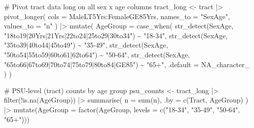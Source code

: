 \documentclass[
  12pt]{article}
\newenvironment{Shaded}{\begin{snugshade}}{\end{snugshade}}
\newcommand{\AttributeTok}[1]{\textcolor[rgb]{0.40,0.45,0.13}{#1}}
\newcommand{\CommentTok}[1]{\textcolor[rgb]{0.37,0.37,0.37}{#1}}
\newcommand{\ConstantTok}[1]{\textcolor[rgb]{0.56,0.35,0.01}{#1}}
\newcommand{\FunctionTok}[1]{\textcolor[rgb]{0.28,0.35,0.67}{#1}}
\newcommand{\NormalTok}[1]{\textcolor[rgb]{0.00,0.23,0.31}{#1}}
\newcommand{\OtherTok}[1]{\textcolor[rgb]{0.00,0.23,0.31}{#1}}
\newcommand{\SpecialCharTok}[1]{\textcolor[rgb]{0.37,0.37,0.37}{#1}}
\newcommand{\StringTok}[1]{\textcolor[rgb]{0.13,0.47,0.30}{#1}}
\begin{document}
\begin{Shaded}
\begin{Highlighting}[]
\CommentTok{\# Pivot tract data long on all sex x age columns}
\NormalTok{tract\_long }\OtherTok{\textless{}{-}}\NormalTok{ tract }\SpecialCharTok{|\textgreater{}}
  \FunctionTok{pivot\_longer}\NormalTok{(}
    \AttributeTok{cols =}\NormalTok{ MaleLT5Yrs}\SpecialCharTok{:}\NormalTok{FemaleGE85Yrs,}
    \AttributeTok{names\_to =} \StringTok{"SexAge"}\NormalTok{,}
    \AttributeTok{values\_to =} \StringTok{"n"}
\NormalTok{  ) }\SpecialCharTok{|\textgreater{}}
  \FunctionTok{mutate}\NormalTok{(}
    \AttributeTok{AgeGroup =} \FunctionTok{case\_when}\NormalTok{(}
      \FunctionTok{str\_detect}\NormalTok{(SexAge, }\StringTok{"18to19|20Yrs|21Yrs|22to24|25to29|30to34"}\NormalTok{) }\SpecialCharTok{\textasciitilde{}} \StringTok{"18{-}34"}\NormalTok{,}
      \FunctionTok{str\_detect}\NormalTok{(SexAge, }\StringTok{"35to39|40to44|45to49"}\NormalTok{)                    }\SpecialCharTok{\textasciitilde{}} \StringTok{"35{-}49"}\NormalTok{,}
      \FunctionTok{str\_detect}\NormalTok{(SexAge, }\StringTok{"50to54|55to59|60to61|62to64"}\NormalTok{)             }\SpecialCharTok{\textasciitilde{}} \StringTok{"50{-}64"}\NormalTok{,}
      \FunctionTok{str\_detect}\NormalTok{(SexAge, }\StringTok{"65to66|67to69|70to74|75to79|80to84|GE85"}\NormalTok{) }\SpecialCharTok{\textasciitilde{}} \StringTok{"65+"}\NormalTok{,}
      \AttributeTok{.default =} \ConstantTok{NA\_character\_}
\NormalTok{    )}
\NormalTok{  )}

\CommentTok{\# PSU{-}level (tract) counts by age group}
\NormalTok{psu\_counts }\OtherTok{\textless{}{-}}\NormalTok{ tract\_long }\SpecialCharTok{|\textgreater{}}
  \FunctionTok{filter}\NormalTok{(}\SpecialCharTok{!}\FunctionTok{is.na}\NormalTok{(AgeGroup)) }\SpecialCharTok{|\textgreater{}}
  \FunctionTok{summarise}\NormalTok{(}
    \AttributeTok{n =} \FunctionTok{sum}\NormalTok{(n),}
    \AttributeTok{.by =} \FunctionTok{c}\NormalTok{(Tract, AgeGroup)}
\NormalTok{  ) }\SpecialCharTok{|\textgreater{}}
  \FunctionTok{mutate}\NormalTok{(}\AttributeTok{AgeGroup =} \FunctionTok{factor}\NormalTok{(AgeGroup, }\AttributeTok{levels =} \FunctionTok{c}\NormalTok{(}\StringTok{"18{-}34"}\NormalTok{, }\StringTok{"35{-}49"}\NormalTok{, }\StringTok{"50{-}64"}\NormalTok{, }\StringTok{"65+"}\NormalTok{)))}


\end{Highlighting}
\end{Shaded}
\end{document}
